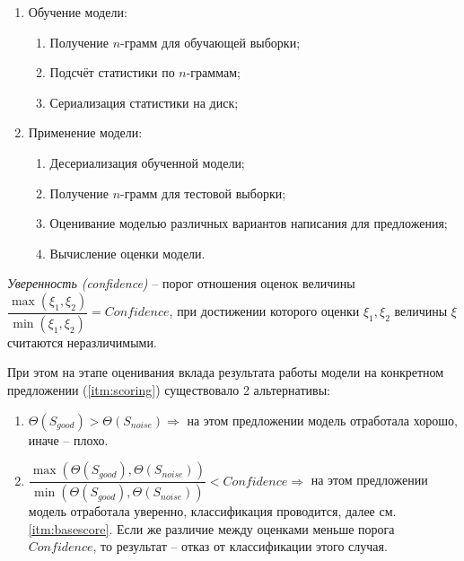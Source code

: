 \begin{enumerate}
	\item Обучение модели:
	
	\begin{enumerate}
		\item Получение $n$-грамм для обучающей выборки;
		
		\item Подсчёт статистики по $n$-граммам;
		
		\item Сериализация статистики на диск;
	\end{enumerate}
	
	\item Применение модели:
	\begin{enumerate}
		\item Десериализация обученной модели;
		
		\item Получение $n$-грамм для тестовой выборки;
		
		\item Оценивание моделью различных вариантов написания для предложения;
		
		\item \label{itm:scoring} Вычисление оценки модели.
	\end{enumerate}	
\end{enumerate}

\begin{definition}
	{\textit{Уверенность (confidence)}} -- порог отношения оценок величины $\dfrac{\max(\xi_1, \xi_2)}{\min(\xi_1, \xi_2)} = Confidence$, при достижении которого оценки $\xi_1, \xi_2$ величины $\xi$ считаются неразличимыми.
\end{definition}

При этом на этапе оценивания вклада результата работы модели на конкретном предложении (\cref{itm:scoring}) существовало 2 альтернативы:

\begin{enumerate}
	\item \label{itm:basescore} $\Theta(S_{good}) > \Theta(S_{noise}) \Rightarrow $ на этом предложении модель отработала хорошо, иначе -- плохо.
	
	\item $\dfrac{\max(\Theta(S_{good}), \Theta(S_{noise}))}{\min(\Theta(S_{good}), \Theta(S_{noise}))} < Confidence \Rightarrow $ на этом предложении модель отработала уверенно, классификация проводится, далее см. \cref{itm:basescore}. Если же различие между оценками меньше порога $Confidence$, то результат -- отказ от классификации этого случая.
	
\end{enumerate}

